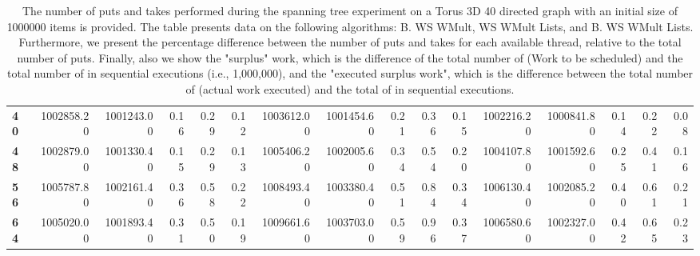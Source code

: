 \begin{table}[!ht]
{\begin{tabular}{lrrrrrrrrrrrrrrr}
\textbf{40} &  1002858.20 & 1001243.00 &           0.16 &        0.29 &                 0.12 &     1003612.00 & 1001454.60 &           0.21 &        0.36 &                 0.15 &        1002216.20 & 1000841.80 &           0.14 &        0.22 &                 0.08 \\
\textbf{48} &  1002879.00 & 1001330.40 &           0.15 &        0.29 &                 0.13 &     1005406.20 & 1002005.60 &           0.34 &        0.54 &                 0.20 &        1004107.80 & 1001592.60 &           0.25 &        0.41 &                 0.16 \\
\textbf{56} &  1005787.80 & 1002161.40 &           0.36 &        0.58 &                 0.22 &     1008493.40 & 1003380.40 &           0.51 &        0.84 &                 0.34 &        1006130.40 & 1002085.20 &           0.40 &        0.61 &                 0.21 \\
\textbf{64} &  1005020.00 & 1001893.40 &           0.31 &        0.50 &                 0.19 &     1009661.60 & 1003703.00 &           0.59 &        0.96 &                 0.37 &        1006580.60 & 1002327.00 &           0.42 &        0.65 &                 0.23 \\
\bottomrule
\end{tabular}}
\label{difference-Torus_3D_40_directed-1000000-B_WS_NC_MULT_OPT-WS_NC_MULT_LA_OPT-B_WS_NC_MULT_LA_OPT}
\caption{The number of puts and takes performed during the
    spanning tree experiment on a Torus 3D 40 directed graph with an initial size
    of 1000000 items is provided. The table presents data on the
    following algorithms: B. WS WMult, WS WMult Lists, and
    B. WS WMult Lists. Furthermore, we present the percentage difference
    between the number of puts and takes for each available thread,
    relative to the total number of puts. Finally, also we show the
    "surplus" work, which is the difference of the total number of
    \Puts (Work to be scheduled) and the total number of \Puts in
    sequential executions (i.e., 1,000,000), and the "executed surplus
    work", which is the difference between the total number of \Takes
    (actual work executed) and the total of \Takes in sequential
    executions.}
\end{table}
